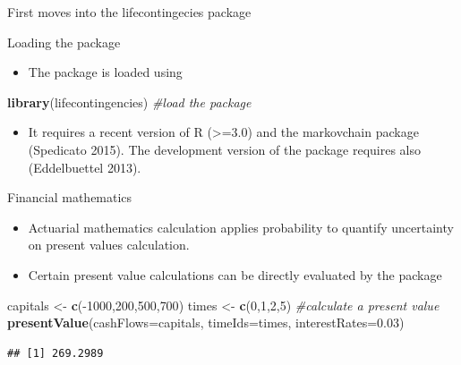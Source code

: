 \documentclass[ignorenonframetext,]{beamer}
\newenvironment{Shaded}{\begin{snugshade}}{\end{snugshade}}
\newcommand{\KeywordTok}[1]{\textcolor[rgb]{0.13,0.29,0.53}{\textbf{{#1}}}}
\newcommand{\DataTypeTok}[1]{\textcolor[rgb]{0.13,0.29,0.53}{{#1}}}
\newcommand{\DecValTok}[1]{\textcolor[rgb]{0.00,0.00,0.81}{{#1}}}
\newcommand{\FloatTok}[1]{\textcolor[rgb]{0.00,0.00,0.81}{{#1}}}
\newcommand{\StringTok}[1]{\textcolor[rgb]{0.31,0.60,0.02}{{#1}}}
\newcommand{\CommentTok}[1]{\textcolor[rgb]{0.56,0.35,0.01}{\textit{{#1}}}}
\newcommand{\NormalTok}[1]{{#1}}
\begin{document}
\begin{frame}[fragile]{First moves into the lifecontingecies package}

\begin{block}{Loading the package}

\begin{itemize}[<+->]
\itemsep1pt\parskip0pt
\item
  The package is loaded using
\end{itemize}

\begin{Shaded}
\begin{Highlighting}[]
\KeywordTok{library}\NormalTok{(lifecontingencies) }\CommentTok{#load the package}
\end{Highlighting}
\end{Shaded}

\begin{itemize}[<+->]
\itemsep1pt\parskip0pt
\item
  It requires a recent version of R (\textgreater{}=3.0) and the
  markovchain package (Spedicato 2015). The development version of the
  package requires also (Eddelbuettel 2013).
\end{itemize}

\end{block}

\end{frame}

\begin{frame}[fragile]

\begin{block}{Financial mathematics}

\begin{itemize}[<+->]
\itemsep1pt\parskip0pt
\item
  Actuarial mathematics calculation applies probability to quantify
  uncertainty on present values calculation.
\item
  Certain present value calculations can be directly evaluated by the
  package
\end{itemize}

\begin{Shaded}
\begin{Highlighting}[]
\NormalTok{capitals <-}\StringTok{ }\KeywordTok{c}\NormalTok{(-}\DecValTok{1000}\NormalTok{,}\DecValTok{200}\NormalTok{,}\DecValTok{500}\NormalTok{,}\DecValTok{700}\NormalTok{)}
\NormalTok{times <-}\StringTok{ }\KeywordTok{c}\NormalTok{(}\DecValTok{0}\NormalTok{,}\DecValTok{1}\NormalTok{,}\DecValTok{2}\NormalTok{,}\DecValTok{5}\NormalTok{)}
\CommentTok{#calculate a present value}
\KeywordTok{presentValue}\NormalTok{(}\DataTypeTok{cashFlows=}\NormalTok{capitals, }\DataTypeTok{timeIds=}\NormalTok{times, }
             \DataTypeTok{interestRates=}\FloatTok{0.03}\NormalTok{)}
\end{Highlighting}
\end{Shaded}

\begin{verbatim}
## [1] 269.2989
\end{verbatim}

\end{block}

\end{frame}
\end{document}
